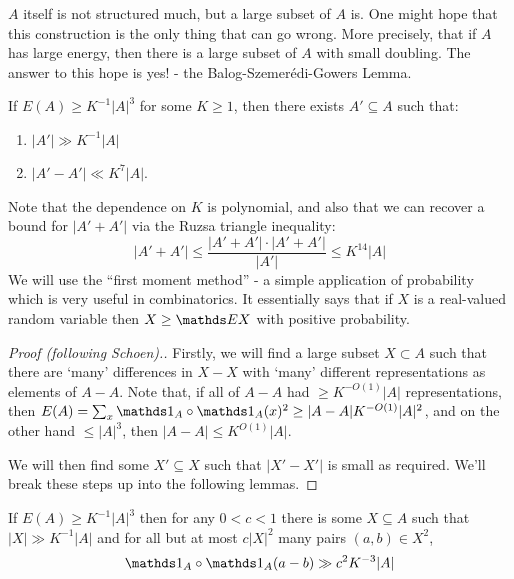\documentclass[10pt,a4paper]{article}
\begin{document}
$A$ itself is not structured much, but a large subset of $A$ is. One might hope that this construction is the only thing that can go wrong. More precisely, that if $A$ has large energy, then there is a large subset of $A$ with small doubling. The answer to this hope is yes! - the Balog-Szemer\'edi-Gowers Lemma.
\begin{lemma}
  If $E(A) \geq K^{-1} |A|^3$ for some $K \geq 1$, then there exists $A' \subseteq A$ such that:
  \begin{enumerate}
    \item $|A'| \gg K^{-1}|A|$
    \item $|A'-A'| \ll K^7 |A|$.
  \end{enumerate}
\end{lemma}
Note that the dependence on $K$ is polynomial, and also that we can recover a bound for $|A'+A'|$ via the Ruzsa triangle inequality:
\[|A'+A'| \leq \frac{|A'+A'|\cdot |A'+A'|}{|A'|} \leq K^{14}|A|\]
We will use the ``first moment method'' -  a simple application of probability which is very useful in combinatorics. It essentially says that if $X$ is a real-valued random variable then $X \geq \E X$ with positive probability.
\begin{proof}[Proof (following Schoen).]
  Firstly, we will find a large subset $X \subset A$ such that there are `many' differences in $X-X$ with `many' different representations as elements of $A-A$. Note that, if all of $A-A$ had $\geq K^{-O(1)}|A|$ representations, then $E(A) = \sum_x \one_A \circ \one_A (x)^2 \geq |A-A|K^{-O(1)}|A|^2$, and on the other hand $\leq |A|^3$, then $|A-A| \leq K^{O(1)}|A|$.

  We will then find some $X' \subseteq X$ such that $|X'-X'|$ is small as required. We'll break these steps up into the following lemmas.
\end{proof}
\begin{lemma}
  If $E(A) \geq K^{-1}|A|^3$ then for any $0 < c < 1$ there is some $X \subseteq A$ such that $|X| \gg K^{-1}|A|$ and for all but at most $c|X|^2$ many pairs $(a,b)\in X^2$,
  \[\one_A\circ \one_A (a-b) \gg c^2 K^{-3}|A|\]
\end{lemma}
\end{document}
